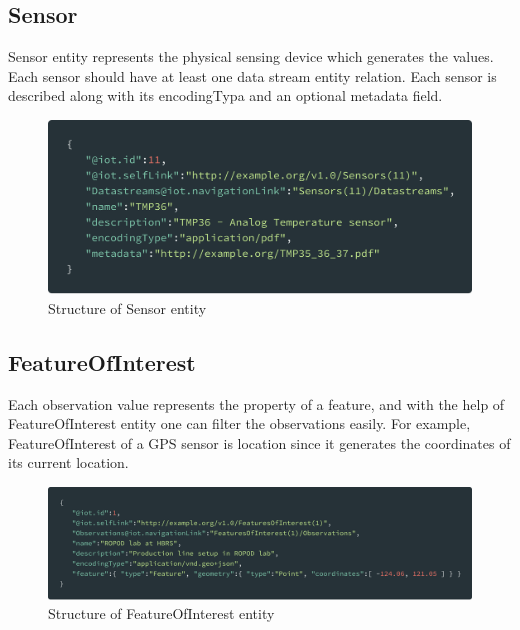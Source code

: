 	\subsection{Sensor}
	Sensor entity represents the physical sensing device which generates the values. Each sensor should have at least one data stream entity relation. Each sensor is described along with its encodingTypa and an optional metadata field.
	
	\begin{figure}[!htbp] 
		\begin{center}
			\includegraphics[scale=0.1]{./images/png/ogc/sensor}	
			\caption{Structure of Sensor entity}	
			\label{fig:sensor}	
		\end{center}
	\end{figure}

	\subsection{FeatureOfInterest}
	Each observation value represents the property of a feature, and with the help of FeatureOfInterest entity one can filter the observations easily. For example, FeatureOfInterest of a GPS sensor is location since it generates the coordinates of its current location.
	
	\begin{figure}[!htbp] 
		\begin{center}
			\includegraphics[scale=0.1]{./images/png/ogc/featureofinterest}	
			\caption{Structure of FeatureOfInterest entity}	
			\label{fig:featureofinterest}	
		\end{center}
	\end{figure}
	

